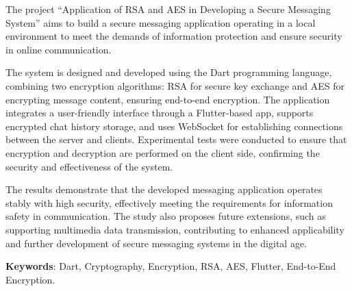{\normalsize
\indent The project “Application of RSA and AES in Developing a Secure Messaging System” aims to build a secure messaging application operating in a local environment to meet the demands of information protection and ensure security in online communication.

\indent The system is designed and developed using the Dart programming language, combining two encryption algorithms: RSA for secure key exchange and AES for encrypting message content, ensuring end-to-end encryption. The application integrates a user-friendly interface through a Flutter-based app, supports encrypted chat history storage, and uses WebSocket for establishing connections between the server and clients. Experimental tests were conducted to ensure that encryption and decryption are performed on the client side, confirming the security and effectiveness of the system.

\indent The results demonstrate that the developed messaging application operates stably with high security, effectively meeting the requirements for information safety in communication. The study also proposes future extensions, such as supporting multimedia data transmission, contributing to enhanced applicability and further development of secure messaging systems in the digital age.

\indent \textbf{Keywords}: Dart, Cryptography, Encryption, RSA, AES, Flutter, End-to-End Encryption.
}


